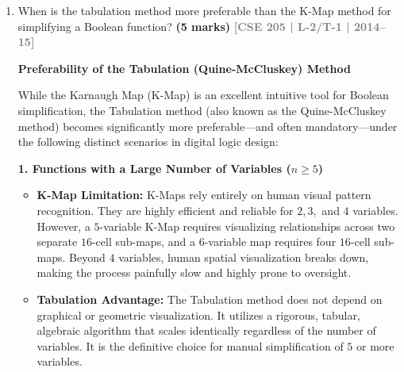 \documentclass[12pt,a3paper]{article}
\newcommand{\yr}[1]{\hfill\textcolor{gray}{\small\textbf{[#1]}}}
\newcommand{\mk}[1]{\textcolor{orange!70!black}{\small\textbf{(#1 marks)}}}
\begin{document}
\begin{enumerate}
\begin{tcolorbox}[enhanced,breakable,ansbox,colback=cC!4,colframe=cC,boxrule=0.8pt,arc=5pt,title={\textbf{Answer}},fonttitle=\bfseries\color{white},colbacktitle=cC]
\end{tcolorbox}

\item When is the tabulation method more preferable than the K-Map method for simplifying a Boolean function?
\mk{5} \yr{CSE 205 | L-2/T-1 | 2014--15}

\begin{tcolorbox}[enhanced,breakable,ansbox,colback=cC!4,colframe=cC,boxrule=0.8pt,arc=5pt,title={\textbf{Answer}},fonttitle=\bfseries\color{white},colbacktitle=cC]

\textbf{\large Preferability of the Tabulation (Quine-McCluskey) Method}

While the Karnaugh Map (K-Map) is an excellent intuitive tool for Boolean simplification, the Tabulation method (also known as the Quine-McCluskey method) becomes significantly more preferable—and often mandatory—under the following distinct scenarios in digital logic design:

\vspace{1em}
\textbf{1. Functions with a Large Number of Variables ($n \ge 5$)}
\begin{itemize}
    \item \textbf{K-Map Limitation:} K-Maps rely entirely on human visual pattern recognition. They are highly efficient and reliable for $2, 3,$ and $4$ variables. However, a $5$-variable K-Map requires visualizing relationships across two separate $16$-cell sub-maps, and a $6$-variable map requires four $16$-cell sub-maps. Beyond $4$ variables, human spatial visualization breaks down, making the process painfully slow and highly prone to oversight.
    \item \textbf{Tabulation Advantage:} The Tabulation method does not depend on graphical or geometric visualization. It utilizes a rigorous, tabular, algebraic algorithm that scales identically regardless of the number of variables. It is the definitive choice for manual simplification of $5$ or more variables.
\end{itemize}


\end{tcolorbox}
\end{enumerate}
\end{document}

